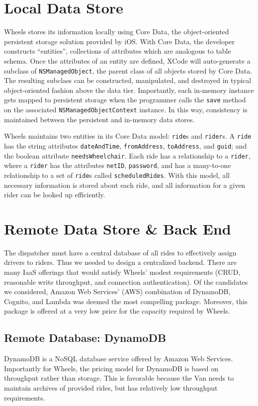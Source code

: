 \documentclass[12pt, a4paper]{article}
\begin{document}
\begin{multicols*}{2}
\section{Local Data Store}\label{sec:local-db}
Wheels stores its information locally using Core Data, the object-oriented persistent storage solution provided by iOS. With Core Data, the developer constructs ``entities'', collections of attributes which are analogous to table schema. Once the attributes of an entity are defined, XCode will auto-generate a subclass of \texttt{NSManagedObject}, the parent class of all objects stored by Core Data. The resulting subclass can be constructed, manipulated, and destroyed in typical object-oriented fashion above the data tier. Importantly, each in-memory instance gets mapped to persistent storage when the programmer calls the \texttt{save} method on the associated \texttt{NSManagedObjectContext} instance. In this way, consistency is maintained between the persistent and in-memory data stores.

Wheels maintains two entities in its Core Data model: \texttt{ride}s and \texttt{rider}s. A \texttt{ride} has the string attributes \texttt{dateAndTime}, \texttt{fromAddress}, \texttt{toAddress}, and \texttt{guid}; and the boolean attribute \texttt{needsWheelchair}. Each ride has a relationship to a \texttt{rider}, where a \texttt{rider} has the attributes \texttt{netID}, \texttt{password}, and has a many-to-one relationship to a set of \texttt{ride}s called \texttt{scheduledRides}. With this model, all necessary information is stored about each ride, and all information for a given rider can be looked up efficiently.
\section{Remote Data Store \& Back End}\label{sec:back-end}
The dispatcher must have a central database of all rides to effectively assign drivers to riders. Thus we needed to design a centralized backend. There are many IaaS offerings that would satisfy Wheels' modest requirements (CRUD, reasonable write throughput, and connection authentication). Of the candidates we considered, Amazon Web Services' (AWS) combination of DynamoDB, Cognito, and Lambda was deemed the most compelling package. Moreover, this package is offered at a very low price for the capacity required by Wheels.
\subsection{Remote Database: DynamoDB}
DynamoDB is a NoSQL database service offered by Amazon Web Services. Importantly for Wheels, the pricing model for DynamoDB is based on throughput rather than storage. This is favorable because the Van needs to maintain archives of provided rides, but has relatively low throughput requirements.


\end{multicols*}
\end{document}
